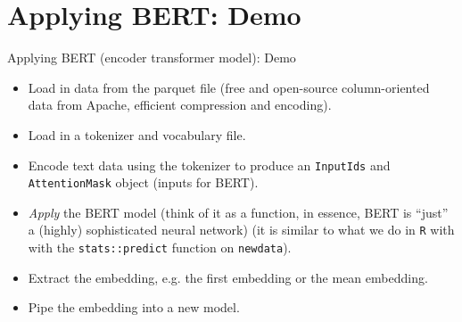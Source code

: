 \documentclass[aspectratio=169, xcolor=dvipsnames, handout]{beamer} %
\begin{document}
\section{Applying BERT: Demo}
\begin{frame}{Applying BERT (encoder transformer model): Demo}
\pause
 \begin{itemize}
  \item Load in data from the parquet file (free and open-source column-oriented data from Apache, efficient compression and encoding). \pause
  \item Load in a tokenizer and vocabulary file. \pause
  \item Encode text data using the tokenizer to produce an \texttt{InputIds} and \texttt{AttentionMask} object (inputs for BERT). \pause
  \item \textit{Apply} the BERT model (think of it as a function, in essence, BERT is ``just'' a (highly) sophisticated neural network) (it is similar to what we do in \texttt{R} with with the \texttt{stats::predict} function on \texttt{newdata}). \pause
  \item Extract the embedding, e.g. the first embedding or the mean embedding. \pause
  \item Pipe the embedding into a new model.
 \end{itemize}

\end{frame}
\end{document}

